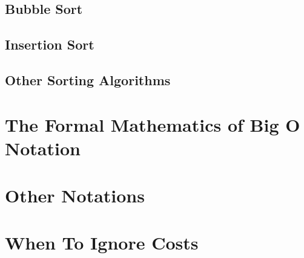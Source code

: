 \subsection{Bubble Sort}
\subsection{Insertion Sort}
\subsection{Other Sorting Algorithms}


\section{The Formal Mathematics of Big O Notation}
\section{Other Notations}


\section{When To Ignore Costs}